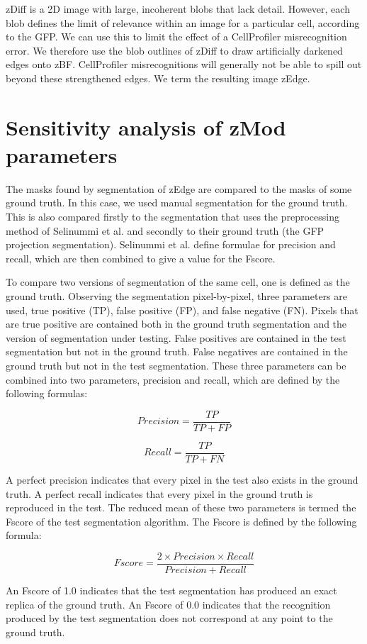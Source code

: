 zDiff is a 2D image with large, incoherent blobs that lack detail. However, each blob defines the limit of relevance within an image for a particular cell, according to the GFP. We can use this to limit the effect of a CellProfiler misrecognition error. We therefore use the blob outlines of zDiff to draw artificially darkened edges onto zBF. CellProfiler misrecognitions will generally not be able to spill out beyond these strengthened edges. We term the resulting image zEdge.

\section{Sensitivity analysis of zMod parameters}

The masks found by segmentation of zEdge are compared to the masks of some ground truth. In this case, we used manual segmentation for the ground truth. This is also compared firstly to the segmentation that uses the preprocessing method of Selinummi et al. and secondly to their ground truth (the GFP projection segmentation). Selinummi et al. define formulae for precision and recall, which are then combined to give a value for the Fscore.

To compare two versions of segmentation of the same cell, one is defined as the ground truth. Observing the segmentation pixel-by-pixel, three parameters are used, true positive (TP), false positive (FP), and false negative (FN). Pixels that are true positive are contained both in the ground truth segmentation and the version of segmentation under testing. False positives are contained in the test segmentation but not in the ground truth. False negatives are contained in the ground truth but not in the test segmentation. These three parameters can be combined into two parameters, precision and recall, which are defined by the following formulas:

\begin{equation}
Precision = \frac{TP}{TP + FP}
\end{equation}

\begin{equation}
Recall = \frac{TP}{TP + FN}
\end{equation}

A perfect precision indicates that every pixel in the test also exists in the ground truth. A perfect recall indicates that every pixel in the ground truth is reproduced in the test. The reduced mean of these two parameters is termed the Fscore of the test segmentation algorithm. The Fscore is defined by the following formula:

\begin{equation}
Fscore = \frac{2 \times Precision \times Recall}{Precision + Recall}
\end{equation}

An Fscore of 1.0 indicates that the test segmentation has produced an exact replica of the ground truth. An Fscore of 0.0 indicates that the recognition produced by the test segmentation does not correspond at any point to the ground truth.
